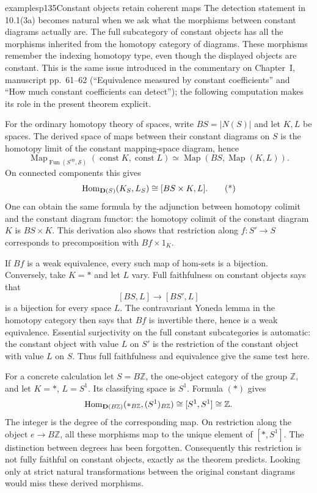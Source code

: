 \begin{dcomment}{examples}{p135}{Constant objects retain coherent maps}
The detection statement in 10.1(3a) becomes natural when we ask what the morphisms between constant diagrams actually are. The full subcategory of constant objects has all the morphisms inherited from the homotopy category of diagrams. These morphisms remember the indexing homotopy type, even though the displayed objects are constant. This is the same issue introduced in the commentary on Chapter~I, manuscript pp.~61--62 (``Equivalence measured by constant coefficients'' and ``How much constant coefficients can detect''); the following computation makes its role in the present theorem explicit.

For the ordinary homotopy theory of spaces, write $BS=|N(S)|$ and let $K,L$ be spaces. The derived space of maps between their constant diagrams on $S$ is the homotopy limit of the constant mapping-space diagram, hence
\[
 \operatorname{Map}_{\operatorname{Fun}(S^{\mathrm{op}},\mathcal S)}
       (\operatorname{const}K,\operatorname{const}L)
 \simeq \operatorname{Map}(BS,\operatorname{Map}(K,L)).
\]
On connected components this gives
\[
 \Hom_{\mathbf D(S)}(K_S,L_S)\cong[BS\times K,L].\tag{*}
\]
One can obtain the same formula by the adjunction between homotopy colimit and the constant diagram functor: the homotopy colimit of the constant diagram $K$ is $BS\times K$. This derivation also shows that restriction along $f:S'\longrightarrow S$ corresponds to precomposition with $Bf\times1_K$.

If $Bf$ is a weak equivalence, every such map of hom-sets is a bijection. Conversely, take $K=*$ and let $L$ vary. Full faithfulness on constant objects says that
\[
 [BS,L]\longrightarrow[BS',L]
\]
is a bijection for every space $L$. The contravariant Yoneda lemma in the homotopy category then says that $Bf$ is invertible there, hence is a weak equivalence. Essential surjectivity on the full constant subcategories is automatic: the constant object with value $L$ on $S'$ is the restriction of the constant object with value $L$ on $S$. Thus full faithfulness and equivalence give the same test here.

For a concrete calculation let $S=B\mathbb Z$, the one-object category of the group $\mathbb Z$, and let $K=*$, $L=S^1$. Its classifying space is $S^1$. Formula $(*)$ gives
\[
 \mathrm{Hom}_{\mathbf D(B\mathbb Z)}(*_{B\mathbb Z},(S^1)_{B\mathbb Z})
 \cong[S^1,S^1]\cong\mathbb Z.
\]
The integer is the degree of the corresponding map. On restriction along the object $e\longrightarrow B\mathbb Z$, all these morphisms map to the unique element of $[*,S^1]$. The distinction between degrees has been forgotten. Consequently this restriction is not fully faithful on constant objects, exactly as the theorem predicts. Looking only at strict natural transformations between the original constant diagrams would miss these derived morphisms.


\end{dcomment}
